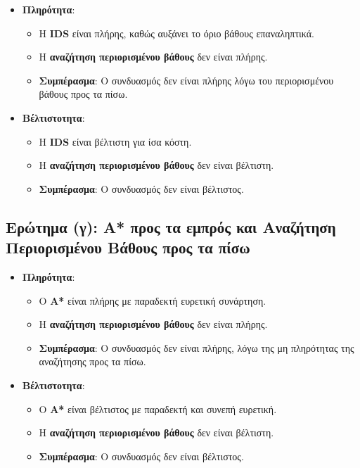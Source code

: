 \documentclass{article}
\begin{document}
\begin{itemize}
    \item \textbf{Πληρότητα}:
    \begin{itemize}
        \item Η \textbf{IDS} είναι πλήρης, καθώς αυξάνει το όριο βάθους επαναληπτικά.
        \item Η \textbf{αναζήτηση περιορισμένου βάθους} δεν είναι πλήρης.
        \item \textbf{Συμπέρασμα}: Ο συνδυασμός δεν είναι πλήρης λόγω του περιορισμένου βάθους προς τα πίσω.
    \end{itemize}
    \item \textbf{Βέλτιστοτητα}:
    \begin{itemize}
        \item Η \textbf{IDS} είναι βέλτιστη για ίσα κόστη.
        \item Η \textbf{αναζήτηση περιορισμένου βάθους} δεν είναι βέλτιστη.
        \item \textbf{Συμπέρασμα}: Ο συνδυασμός δεν είναι βέλτιστος.
    \end{itemize}
\end{itemize}

\subsection*{Ερώτημα (γ): A* προς τα εμπρός και Αναζήτηση Περιορισμένου Βάθους προς τα πίσω}

\begin{itemize}
    \item \textbf{Πληρότητα}:
    \begin{itemize}
        \item Ο \textbf{A*} είναι πλήρης με παραδεκτή ευρετική συνάρτηση.
        \item Η \textbf{αναζήτηση περιορισμένου βάθους} δεν είναι πλήρης.
        \item \textbf{Συμπέρασμα}: Ο συνδυασμός δεν είναι πλήρης, λόγω της μη πληρότητας της αναζήτησης προς τα πίσω.
    \end{itemize}
    \item \textbf{Βέλτιστοτητα}:
    \begin{itemize}
        \item Ο \textbf{A*} είναι βέλτιστος με παραδεκτή και συνεπή ευρετική.
        \item Η \textbf{αναζήτηση περιορισμένου βάθους} δεν είναι βέλτιστη.
        \item \textbf{Συμπέρασμα}: Ο συνδυασμός δεν είναι βέλτιστος.
    \end{itemize}
\end{itemize}
\end{document}
